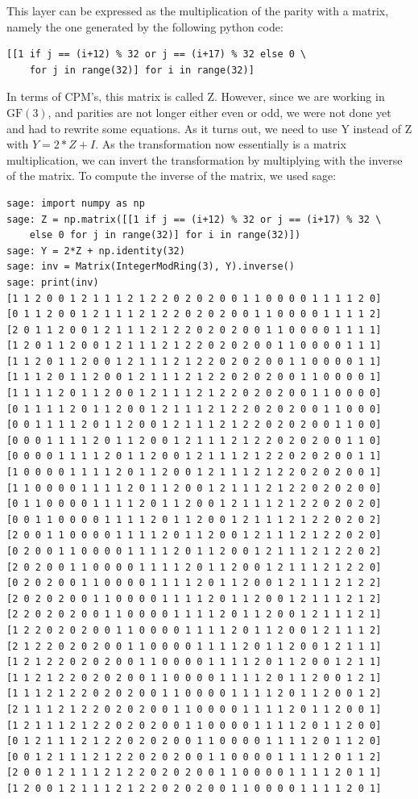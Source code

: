 \documentclass{report}
\newcommand{\GF}{\text{GF}}
\begin{document}
This layer can be expressed as the multiplication of the parity with a matrix, namely the one generated by the following python code:
\begin{verbatim}
[[1 if j == (i+12) % 32 or j == (i+17) % 32 else 0 \
    for j in range(32)] for i in range(32)]
\end{verbatim}
In terms of CPM's, this matrix is called Z. However, since we are working in $\GF(3)$, and parities are not longer either even or odd, we were not done yet and had to rewrite some equations. As it turns out, we need to use Y instead of Z with $Y = 2*Z + I$. As the transformation now essentially is a matrix multiplication, we can invert the transformation by multiplying with the inverse of the matrix. To compute the inverse of the matrix, we used sage:
\begin{verbatim}
sage: import numpy as np
sage: Z = np.matrix([[1 if j == (i+12) % 32 or j == (i+17) % 32 \
    else 0 for j in range(32)] for i in range(32)])
sage: Y = 2*Z + np.identity(32)
sage: inv = Matrix(IntegerModRing(3), Y).inverse()
sage: print(inv)
[1 1 2 0 0 1 2 1 1 1 2 1 2 2 0 2 0 2 0 0 1 1 0 0 0 0 1 1 1 1 2 0]
[0 1 1 2 0 0 1 2 1 1 1 2 1 2 2 0 2 0 2 0 0 1 1 0 0 0 0 1 1 1 1 2]
[2 0 1 1 2 0 0 1 2 1 1 1 2 1 2 2 0 2 0 2 0 0 1 1 0 0 0 0 1 1 1 1]
[1 2 0 1 1 2 0 0 1 2 1 1 1 2 1 2 2 0 2 0 2 0 0 1 1 0 0 0 0 1 1 1]
[1 1 2 0 1 1 2 0 0 1 2 1 1 1 2 1 2 2 0 2 0 2 0 0 1 1 0 0 0 0 1 1]
[1 1 1 2 0 1 1 2 0 0 1 2 1 1 1 2 1 2 2 0 2 0 2 0 0 1 1 0 0 0 0 1]
[1 1 1 1 2 0 1 1 2 0 0 1 2 1 1 1 2 1 2 2 0 2 0 2 0 0 1 1 0 0 0 0]
[0 1 1 1 1 2 0 1 1 2 0 0 1 2 1 1 1 2 1 2 2 0 2 0 2 0 0 1 1 0 0 0]
[0 0 1 1 1 1 2 0 1 1 2 0 0 1 2 1 1 1 2 1 2 2 0 2 0 2 0 0 1 1 0 0]
[0 0 0 1 1 1 1 2 0 1 1 2 0 0 1 2 1 1 1 2 1 2 2 0 2 0 2 0 0 1 1 0]
[0 0 0 0 1 1 1 1 2 0 1 1 2 0 0 1 2 1 1 1 2 1 2 2 0 2 0 2 0 0 1 1]
[1 0 0 0 0 1 1 1 1 2 0 1 1 2 0 0 1 2 1 1 1 2 1 2 2 0 2 0 2 0 0 1]
[1 1 0 0 0 0 1 1 1 1 2 0 1 1 2 0 0 1 2 1 1 1 2 1 2 2 0 2 0 2 0 0]
[0 1 1 0 0 0 0 1 1 1 1 2 0 1 1 2 0 0 1 2 1 1 1 2 1 2 2 0 2 0 2 0]
[0 0 1 1 0 0 0 0 1 1 1 1 2 0 1 1 2 0 0 1 2 1 1 1 2 1 2 2 0 2 0 2]
[2 0 0 1 1 0 0 0 0 1 1 1 1 2 0 1 1 2 0 0 1 2 1 1 1 2 1 2 2 0 2 0]
[0 2 0 0 1 1 0 0 0 0 1 1 1 1 2 0 1 1 2 0 0 1 2 1 1 1 2 1 2 2 0 2]
[2 0 2 0 0 1 1 0 0 0 0 1 1 1 1 2 0 1 1 2 0 0 1 2 1 1 1 2 1 2 2 0]
[0 2 0 2 0 0 1 1 0 0 0 0 1 1 1 1 2 0 1 1 2 0 0 1 2 1 1 1 2 1 2 2]
[2 0 2 0 2 0 0 1 1 0 0 0 0 1 1 1 1 2 0 1 1 2 0 0 1 2 1 1 1 2 1 2]
[2 2 0 2 0 2 0 0 1 1 0 0 0 0 1 1 1 1 2 0 1 1 2 0 0 1 2 1 1 1 2 1]
[1 2 2 0 2 0 2 0 0 1 1 0 0 0 0 1 1 1 1 2 0 1 1 2 0 0 1 2 1 1 1 2]
[2 1 2 2 0 2 0 2 0 0 1 1 0 0 0 0 1 1 1 1 2 0 1 1 2 0 0 1 2 1 1 1]
[1 2 1 2 2 0 2 0 2 0 0 1 1 0 0 0 0 1 1 1 1 2 0 1 1 2 0 0 1 2 1 1]
[1 1 2 1 2 2 0 2 0 2 0 0 1 1 0 0 0 0 1 1 1 1 2 0 1 1 2 0 0 1 2 1]
[1 1 1 2 1 2 2 0 2 0 2 0 0 1 1 0 0 0 0 1 1 1 1 2 0 1 1 2 0 0 1 2]
[2 1 1 1 2 1 2 2 0 2 0 2 0 0 1 1 0 0 0 0 1 1 1 1 2 0 1 1 2 0 0 1]
[1 2 1 1 1 2 1 2 2 0 2 0 2 0 0 1 1 0 0 0 0 1 1 1 1 2 0 1 1 2 0 0]
[0 1 2 1 1 1 2 1 2 2 0 2 0 2 0 0 1 1 0 0 0 0 1 1 1 1 2 0 1 1 2 0]
[0 0 1 2 1 1 1 2 1 2 2 0 2 0 2 0 0 1 1 0 0 0 0 1 1 1 1 2 0 1 1 2]
[2 0 0 1 2 1 1 1 2 1 2 2 0 2 0 2 0 0 1 1 0 0 0 0 1 1 1 1 2 0 1 1]
[1 2 0 0 1 2 1 1 1 2 1 2 2 0 2 0 2 0 0 1 1 0 0 0 0 1 1 1 1 2 0 1]
\end{verbatim}
\end{document}
